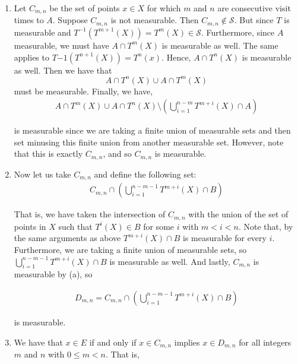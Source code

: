 \documentclass[12pt]{article}
\newenvironment{problem}[2][Problem]{\begin{trivlist}
\item[\hskip \labelsep {\bfseries #1}\hskip \labelsep {\bfseries #2.}]}{\end{trivlist}}
\begin{document}
\begin{enumerate}[label=(\alph*)]

\item Let $C_{m,n}$ be the set of points $x \in X$ for which $m$ and $n$ are consecutive visit times to $A$. Suppose $C_{m,n}$ is not measurable. Then $C_{m, n} \not\in \mathcal{S}$. But since $T$ is measurable and $T^{-1}(T^{m+1}(X)) = T^m(X) \in \mathcal{S}$. Furthermore, since $A$ measurable, we must have $A \cap T^m(X)$ is measurable as well. The same applies to $T{-1}(T^{n+1}(X)) = T^n(x)$. Hence, $A \cap T^n(X)$ is measurable as well. Then we have that $$A \cap T^n(X) \cup A \cap T^m(X)$$ must be measurable. Finally, we have,
\begin{align*}
A \cap T^m(X) \cup A \cap T^n(X) \setminus \left( \bigcup_{i=1}^{n-m} T^{m+i}(X) \cap A \right)
\end{align*}

is measurable since we are taking a finite union of measurable sets and then set minusing this finite union from another measurable set. However, note that this is exactly $C_{m,n}$, and so $C_{m,n}$ is measurable.

\item Now let us take $C_{m,n}$ and define the following set:
\begin{align*}
C_{m,n} \cap \left( \bigcup_{i=1}^{n-m-1} T^{m+i}(X) \cap B \right)
\end{align*}

That is, we have taken the intersection of $C_{m,n}$ with the union of the set of points in $X$ such that $T^i(X) \in B$ for some $i$ with $m < i < n$. Note that, by the same arguments as above $T^{m+i}(X) \cap B$ is measurable for every $i$. Furthermore, we are taking a finite union of measurable sets, so $\bigcup_{i=1}^{n-m-1} T^{m+i}(X) \cap B$ is measurable as well. And lastly, $C_{m,n}$ is measurable by (a), so 

\begin{align*}
D_{m,n} = C_{m,n} \cap \left( \bigcup_{i=1}^{n-m-1} T^{m+i}(X) \cap B \right)
\end{align*}

is measurable.

\item We have that $x \in E$ if and only if $x \in C_{m,n}$ implies $x \in D_{m,n}$ for all integers $m$ and $n$ with $0 \leq m < n$. That is,


\end{enumerate}

\begin{problem}{4}
\end{problem}
\end{document}
